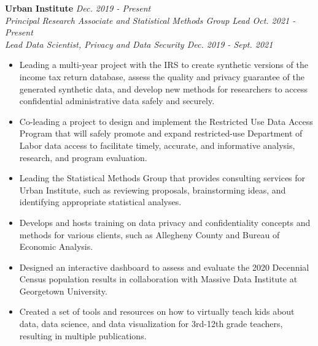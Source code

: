 
\textbf{Urban Institute} \hfill \textit{Dec. 2019 - Present}\\
    \textit{Principal Research Associate and Statistical Methods Group Lead \hfill Oct. 2021 - Present}\\
    \textit{Lead Data Scientist, Privacy and Data Security \hfill Dec. 2019 - Sept. 2021}
    \begin{itemize}
        \item Leading a multi-year project with the IRS to create synthetic versions of the income tax return database, assess the quality and privacy guarantee of the generated synthetic data, and develop new methods for researchers to access confidential administrative data safely and securely.
        \item Co-leading a project to design and implement the Restricted Use Data Access Program that will safely promote and expand restricted-use Department of Labor data access to facilitate timely, accurate, and informative analysis, research, and program evaluation.
        \item Leading the Statistical Methods Group that provides consulting services for Urban Institute, such as reviewing proposals, brainstorming ideas, and identifying appropriate statistical analyses.
        \item Develops and hosts training on data privacy and confidentiality concepts and methods for various clients, such as Allegheny County and Bureau of Economic Analysis.
        \item Designed an interactive dashboard to assess and evaluate the 2020 Decennial Census population results in collaboration with Massive Data Institute at Georgetown University.
        \item Created a set of tools and resources on how to virtually teach kids about data, data science, and data visualization for 3rd-12th grade teachers, resulting in multiple publications.
    \end{itemize}


